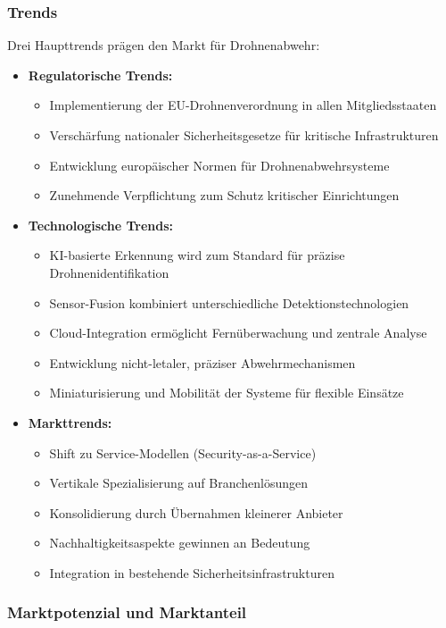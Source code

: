 \documentclass[11pt,a4paper]{article}
\begin{document}
\subsubsection*{Trends}

Drei Haupttrends prägen den Markt für Drohnenabwehr:

\begin{itemize}
\item \textbf{Regulatorische Trends:}
\begin{itemize}
\item Implementierung der EU-Drohnenverordnung in allen Mitgliedsstaaten
\item Verschärfung nationaler Sicherheitsgesetze für kritische Infrastrukturen
\item Entwicklung europäischer Normen für Drohnenabwehrsysteme
\item Zunehmende Verpflichtung zum Schutz kritischer Einrichtungen
\end{itemize}

\item \textbf{Technologische Trends:}
\begin{itemize}
\item KI-basierte Erkennung wird zum Standard für präzise Drohnenidentifikation
\item Sensor-Fusion kombiniert unterschiedliche Detektionstechnologien
\item Cloud-Integration ermöglicht Fernüberwachung und zentrale Analyse
\item Entwicklung nicht-letaler, präziser Abwehrmechanismen
\item Miniaturisierung und Mobilität der Systeme für flexible Einsätze
\end{itemize}

\item \textbf{Markttrends:}
\begin{itemize}
\item Shift zu Service-Modellen (Security-as-a-Service)
\item Vertikale Spezialisierung auf Branchenlösungen
\item Konsolidierung durch Übernahmen kleinerer Anbieter
\item Nachhaltigkeitsaspekte gewinnen an Bedeutung
\item Integration in bestehende Sicherheitsinfrastrukturen
\end{itemize}
\end{itemize}

\subsubsection*{Marktpotenzial und Marktanteil}
\end{document}
